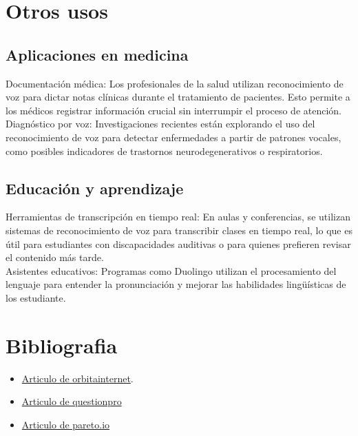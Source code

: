 \documentclass[12pt]{article}
\begin{document}
\clearpage
\section{Otros usos}
\subsection{Aplicaciones en medicina}
Documentación médica: Los profesionales de la salud utilizan reconocimiento de voz para dictar notas clínicas durante el tratamiento de pacientes. 
Esto permite a los médicos registrar información crucial sin interrumpir el proceso de atención.
\\
Diagnóstico por voz: Investigaciones recientes están explorando el uso del reconocimiento de voz para detectar enfermedades a partir de patrones vocales, 
como posibles indicadores de trastornos neurodegenerativos o respiratorios.

\subsection{Educación y aprendizaje}

Herramientas de transcripción en tiempo real: En aulas y conferencias, se utilizan sistemas de reconocimiento de voz para transcribir clases en tiempo real, 
lo que es útil para estudiantes con discapacidades auditivas o para quienes prefieren revisar el contenido más tarde.
\\
Asistentes educativos: Programas como Duolingo utilizan el procesamiento del lenguaje para entender la pronunciación y mejorar las habilidades lingüísticas de los estudiante.

\clearpage

\section{Bibliografia}
\begin{itemize}
    \item \href{https://orbitainternet.com/el-reconocimiento-de-voz-con-inteligencia-artificial-como-funciona-y-su-impacto-en-nuestra-vida-diaria/}{Articulo de orbitainternet}.
    \item \href{https://www.questionpro.com/blog/es/procesamiento-del-lenguaje-natural/}{Articulo de questionpro}
    \item \href{https://blog.pareto.io/es/reconhecimento-por-voz/}{Articulo de pareto.io}
\end{itemize}
\end{document}
